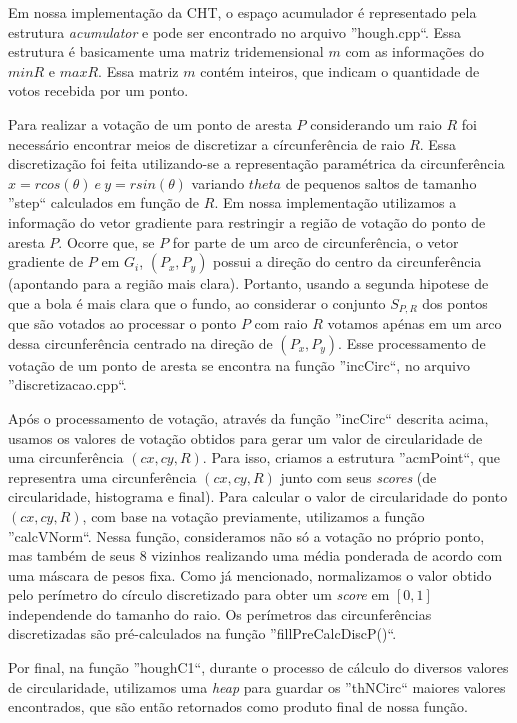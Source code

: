 \documentclass[11pt,a4paper]{article}
\begin{document}
 Em nossa implementação da CHT, o espaço acumulador é representado pela estrutura \textit{acumulator} e pode ser encontrado no arquivo ''hough.cpp``. Essa estrutura é basicamente uma matriz tridemensional $m$ com as informações do $minR$ e $maxR$. Essa matriz $m$ contém inteiros, que indicam o quantidade de votos recebida por um ponto. 

 Para realizar a votação de um ponto de aresta $P$ considerando um raio $R$ foi necessário encontrar meios de discretizar a círcunferência de raio $R$. Essa discretização foi feita utilizando-se a representação paramétrica da circunferência $x = rcos(\theta) ~e~ y = rsin(\theta)$ variando $theta$ de pequenos saltos de tamanho ''step`` calculados em função de $R$. Em nossa implementação utilizamos a informação do vetor gradiente para restringir a região de votação do ponto de aresta $P$. Ocorre que, se $P$ for parte de um arco de circunferência, o vetor gradiente de $P$ em $G_i$, $(P_x,P_y)$ possui a direção do centro da circunferência (apontando para a região mais clara). Portanto, usando a segunda hipotese de que a bola é mais clara que o fundo, ao considerar o conjunto $S_{P,R}$ dos pontos que são votados ao processar o ponto $P$ com raio $R$ votamos apénas em um arco dessa circunferência centrado na direção de $(P_x,P_y)$. Esse processamento de votação de um ponto de aresta se encontra na função ''incCirc``, no arquivo ''discretizacao.cpp``.

 Após o processamento de votação, através da função ''incCirc`` descrita acima, usamos os valores de votação obtidos para gerar um valor de circularidade de uma circunferência $(cx,cy,R)$. Para isso, criamos a estrutura ''acmPoint``, que representra uma circunferência $(cx,cy,R)$ junto com seus \textit{scores} (de circularidade, histograma e final). Para calcular o valor de circularidade do ponto $(cx,cy,R)$, com base na votação previamente, utilizamos a função ''calcVNorm``. Nessa função, consideramos não só a votação no próprio ponto, mas também de seus 8 vizinhos realizando uma média ponderada de acordo com uma máscara de pesos fixa. Como já mencionado, normalizamos o valor obtido pelo perímetro do círculo discretizado para obter um \textit{score} em $[0,1]$ independende do tamanho do raio. Os perímetros das circunferências discretizadas são pré-calculados na função ''fillPreCalcDiscP()``.

Por final, na função ''houghC1``, durante o processo de cálculo do diversos valores de circularidade, utilizamos uma \textit{heap} para guardar os ''thNCirc`` maiores valores encontrados, que são então retornados como produto final de nossa função.
\end{document}
